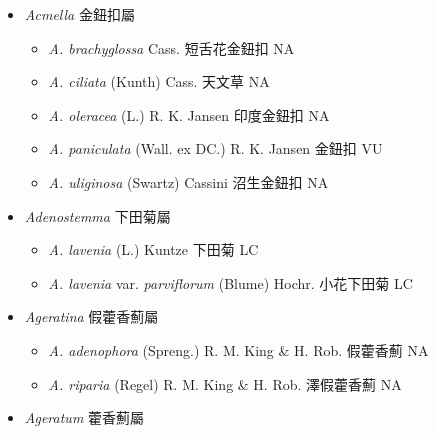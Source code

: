 
  \begin{itemize}
 \item[] \textit{Acmella} 金鈕扣屬
                                
  \begin{itemize}
        \item[] \textit{A. brachyglossa} Cass.  短舌花金鈕扣   NA
        \item[] \textit{A. ciliata} (Kunth) Cass.  天文草   NA
        \item[] \textit{A. oleracea} (L.) R. K. Jansen  印度金鈕扣   NA
        \item[] \textit{A. paniculata} (Wall. ex DC.) R. K. Jansen  金鈕扣   VU
        \item[] \textit{A. uliginosa} (Swartz) Cassini  沼生金鈕扣   NA
  \end{itemize}
 \item[] \textit{Adenostemma} 下田菊屬
                                
  \begin{itemize}
        \item[] \textit{A. lavenia} (L.) Kuntze  下田菊   LC
        \item[] \textit{A. lavenia} var. \textit{parviflorum} (Blume) Hochr.  小花下田菊   LC
  \end{itemize}
 \item[] \textit{Ageratina} 假藿香薊屬
                                
  \begin{itemize}
        \item[] \textit{A. adenophora} (Spreng.) R. M. King \& H. Rob.  假藿香薊   NA
        \item[] \textit{A. riparia} (Regel) R. M. King \& H. Rob.  澤假藿香薊   NA
  \end{itemize}
 \item[] \textit{Ageratum} 藿香薊屬
                                

\end{itemize}
